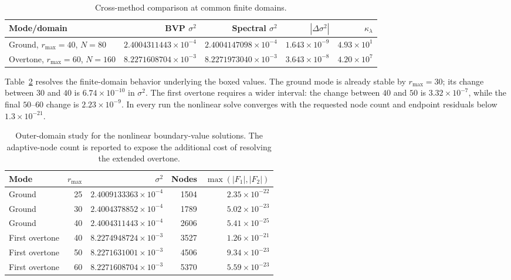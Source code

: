 \documentclass[aps,prd,preprint,onecolumn,nofootinbib,superscriptaddress,showkeys]{revtex4-2}
\newcommand{\sigmatwo}{\sigma^{2}}
\newcommand{\rmax}{r_{\mathrm{max}}}
\begin{document}
\begin{table}[!htbp]
\centering
\caption{Cross-method comparison at common finite domains.}
\label{tab:crossmethod}
\small
\begin{tabular}{@{}lrrrr@{}}
\toprule
Mode/domain & BVP $\sigmatwo$ & Spectral $\sigmatwo$ & $|\Delta\sigmatwo|$ & $\kappa_{\lambda}$ \\
\midrule
Ground, $\rmax=40$, $N=80$ & $2.4004311443\times10^{-4}$ & $2.4004147098\times10^{-4}$ & $1.643\times10^{-9}$ & $4.93\times10^{1}$ \\
Overtone, $\rmax=60$, $N=160$ & $8.2271608704\times10^{-3}$ & $8.2271973040\times10^{-3}$ & $3.643\times10^{-8}$ & $4.20\times10^{7}$ \\
\bottomrule
\end{tabular}
\end{table}

Table~\ref{tab:bvp-domain} resolves the finite-domain behavior underlying the boxed values. The ground mode is already stable by $\rmax=30$; its change between $30$ and $40$ is $6.74\times10^{-10}$ in $\sigmatwo$. The first overtone requires a wider interval: the change between $40$ and $50$ is $3.32\times10^{-7}$, while the final $50$--$60$ change is $2.23\times10^{-9}$. In every run the nonlinear solve converges with the requested node count and endpoint residuals below $1.3\times10^{-21}$.

\begin{table}[!htbp]
\centering
\caption{Outer-domain study for the nonlinear boundary-value solutions. The adaptive-node count is reported to expose the additional cost of resolving the extended overtone.}
\label{tab:bvp-domain}
\small
\begin{tabular}{@{}lrrrr@{}}
\toprule
Mode & $\rmax$ & $\sigmatwo$ & Nodes & $\max(|F_1|,|F_2|)$ \\
\midrule
Ground & 25 & $2.4009133363\times10^{-4}$ & 1504 & $2.35\times10^{-22}$ \\
Ground & 30 & $2.4004378852\times10^{-4}$ & 1789 & $5.02\times10^{-23}$ \\
Ground & 40 & $2.4004311443\times10^{-4}$ & 2606 & $5.41\times10^{-25}$ \\
First overtone & 40 & $8.2274948724\times10^{-3}$ & 3527 & $1.26\times10^{-21}$ \\
First overtone & 50 & $8.2271631001\times10^{-3}$ & 4506 & $9.34\times10^{-23}$ \\
First overtone & 60 & $8.2271608704\times10^{-3}$ & 5370 & $5.59\times10^{-23}$ \\
\bottomrule
\end{tabular}
\end{table}
\end{document}
